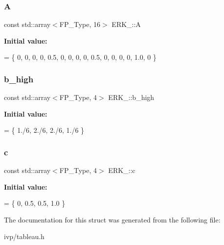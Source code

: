 \subsubsection{\texorpdfstring{A}{A}}
{\footnotesize\ttfamily const std\+::array$<$F\+P\+\_\+\+Type, 16$>$ E\+R\+K\+\_\+::A}

{\bfseries Initial value\+:}
\begin{DoxyCode}
= \{
    0,    0,    0,    0,
    0.5,  0,    0,    0,
    0,    0.5,  0,    0,
    0,    0,    1.0,  0
  \}
\end{DoxyCode}
\mbox{\label{structERK__04_a328bf104ac532f6c42164a9ef0d3b95c}} 
\subsubsection{\texorpdfstring{b\+\_\+high}{b\_high}}
{\footnotesize\ttfamily const std\+::array$<$F\+P\+\_\+\+Type, 4$>$ E\+R\+K\+\_\+::b\+\_\+high}

{\bfseries Initial value\+:}
\begin{DoxyCode}
= \{
    1./6, 2./6, 2./6, 1./6
  \}
\end{DoxyCode}
\mbox{\label{structERK__04_a99fc8b005471e7b1946051149af63ea8}} 
\subsubsection{\texorpdfstring{c}{c}}
{\footnotesize\ttfamily const std\+::array$<$F\+P\+\_\+\+Type, 4$>$ E\+R\+K\+\_\+::c}

{\bfseries Initial value\+:}
\begin{DoxyCode}
= \{
    0, 0.5, 0.5, 1.0
  \}
\end{DoxyCode}


The documentation for this struct was generated from the following file\+:\begin{DoxyCompactItemize}
\item 
ivp/tableau.\+h\end{DoxyCompactItemize}
